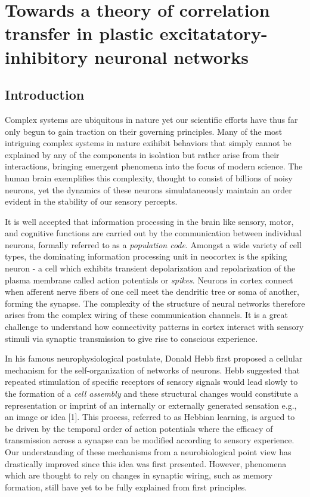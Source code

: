 \documentclass{ucetd}
\begin{document}
\mainmatter

\chapter{Towards a theory of correlation transfer in plastic excitatatory-inhibitory neuronal networks}

\section{Introduction}

Complex systems are ubiquitous in nature yet our scientific efforts have thus far only begun to gain traction on their governing principles. Many of the most intriguing complex systems in nature exihibit behaviors that simply cannot be explained by any of the components in isolation but rather arise from their interactions, bringing emergent phenomena into the focus of modern science. The human brain exemplifies this complexity, thought to consist of billions of noisy neurons, yet the dynamics of these neurons simulataneously maintain an order evident in the stability of our sensory percepts.

It is well accepted that information processing in the brain like sensory, motor, and cognitive functions are carried out by the communication between individual neurons, formally referred to as a \emph{population code}. Amongst a wide variety of cell types, the dominating information processing unit in neocortex is the spiking neuron - a  cell which exhibits transient depolarization and repolarization of the plasma membrane called action potentials or \emph{spikes}.  Neurons in cortex connect when afferent nerve fibers of one cell meet the dendritic tree or soma of another, forming the synapse. The complexity of the structure of neural networks therefore arises from the complex wiring of these communication channels. It is a great challenge to understand how connectivity patterns in cortex interact with sensory stimuli via synaptic transmission to give rise to conscious experience. 

In his famous neurophysiological postulate, Donald Hebb first proposed a cellular mechanism for the self-organization of networks of neurons. Hebb suggested that repeated stimulation of specific receptors of sensory signals would lead slowly to the formation of a \emph{cell assembly} and these structural changes would constitute a representation or imprint of an internally or externally generated sensation e.g., an image or idea [1]. This process, referred to as Hebbian learning, is argued to be driven by the temporal order of action potentials where the efficacy of transmission across a synapse can be modified according to sensory experience. Our understanding of these mechanisms from a neurobiological point view has drastically improved since this idea was first presented. However, phenomena which are thought to rely on changes in synaptic wiring, such as memory formation, still have yet to be fully explained from first principles.
\end{document}
